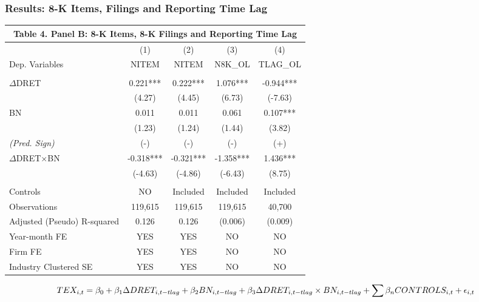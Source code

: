 \documentclass{beamer}
\begin{document}
\begin{frame}
\frametitle{Results: 8-K Items, Filings and Reporting Time Lag}
\begin{table}[H] \label{T4PB}%
	\begin{center}
	\scriptsize	
		\begin{tabular}{lcccc}
			\multicolumn{5}{c}{\textbf{Table 4. Panel B: 8-K Items, 8-K Filings and Reporting Time Lag}} \\
			\midrule
			\midrule
			& (1) & (2) & (3) & (4) \\
			Dep. Variables & NITEM & NITEM & N8K\_OL & TLAG\_OL \\
			\midrule
			&   &   &   &  \\
			$\Delta$DRET & 0.221*** & 0.222*** & 1.076*** & -0.944*** \\
			& (4.27) & (4.45) & (6.73) & (-7.63) \\
			BN & 0.011 & 0.011 & 0.061 & 0.107*** \\
			& (1.23) & (1.24) & (1.44) & (3.82) \\
			\textit{(Pred. Sign)} & (-) & (-) & (-) & (+) \\
			 $\Delta$DRET$\times$BN & -0.318*** & -0.321*** & -1.358*** & 1.436*** \\
			 & (-4.63) & (-4.86) & (-6.43) & (8.75) \\

			&   &   &   &  \\
			Controls & NO & Included & Included & Included \\
			Observations & 119,615 & 119,615 & 119,615 & 40,700 \\
			Adjusted (Pseudo) R-squared & 0.126 & 0.126  & (0.006) & (0.009) \\
			Year-month FE & YES & YES & NO & NO \\
			Firm FE & YES & YES & NO & NO \\
			Industry Clustered SE & YES & YES & NO & NO \\
			\bottomrule
			\bottomrule
		\end{tabular}%
	\end{center}
	\begin{footnotesize}
			
		\setcounter{equation}{1}
		\begin{equation} \tiny	
		TEX_{i,t}=\beta_0+\beta_1\Delta DRET_{i,t-tlag}+\beta_2BN_{i,t-tlag}+\beta_3\Delta DRET_{i,t-tlag}\times 	BN_{i,t-tlag}+\sum\beta_nCONTROLS_{i,t}+\epsilon_{i,t}
		\end{equation}

	\end{footnotesize}
\end{table}

\end{frame}
\end{document}
